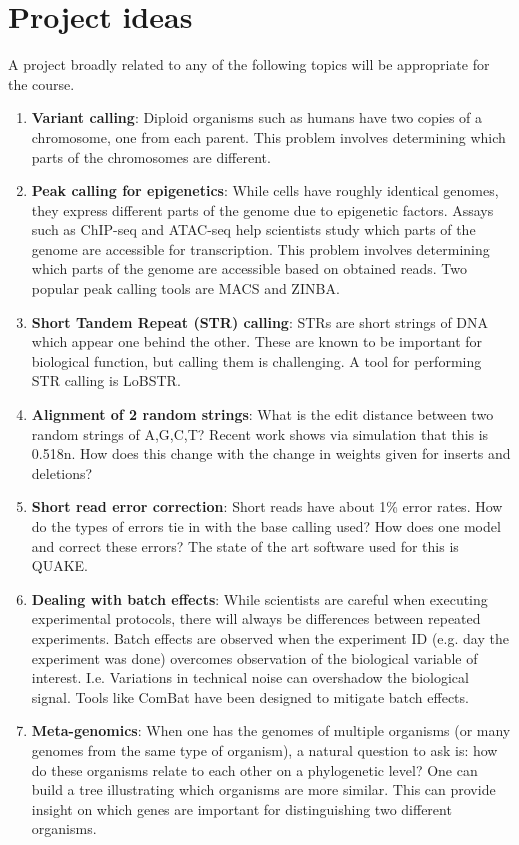 \documentclass[11pt,onecolumn]{article}
\begin{document}
\section{Project ideas}
A project broadly related to any of the following topics will be  appropriate for the course.

\begin{enumerate}
	\item \textbf{Variant calling}: Diploid organisms such as humans have two copies of a chromosome, one from each parent. This problem involves determining which parts of the chromosomes are different. 
	\item \textbf{Peak calling for epigenetics}: While cells have roughly identical genomes, they express different parts of the genome due to epigenetic factors. Assays such as ChIP-seq and ATAC-seq help scientists study which parts of the genome are accessible for transcription. This problem involves determining which parts of the genome are accessible based on obtained reads. Two popular peak calling tools are MACS and ZINBA.
	\item \textbf{Short Tandem Repeat (STR) calling}: STRs are short strings of DNA which appear one behind the other. These are known to be important for biological function, but calling them is challenging. A tool for performing STR calling is LoBSTR.
	\item \textbf{Alignment of 2 random strings}: What is the edit distance between two random strings of A,G,C,T? Recent work shows via simulation that this is 0.518n. How does this change with the change in weights given for inserts and deletions?
	\item \textbf{Short read error correction}: Short reads have about 1\% error rates. How do the types of errors tie in with the base calling used? How does one model and correct these errors? The state of the art software used for this is QUAKE.
	\item \textbf{Dealing with batch effects}: While scientists are careful when executing experimental protocols, there will always be differences between repeated experiments. Batch effects are observed when the experiment ID (e.g. day the experiment was done) overcomes observation of the biological variable of interest. I.e. Variations in technical noise can overshadow the biological signal. Tools like ComBat have been designed to mitigate batch effects.
	\item \textbf{Meta-genomics}: When one has the genomes of multiple organisms (or many genomes from the same type of organism), a natural question to ask is: how do these organisms relate to each other on a phylogenetic level? One can build a tree illustrating which organisms are more similar. This can provide insight on which genes are important for distinguishing two different organisms.

\end{enumerate}
\end{document}
